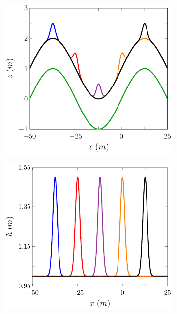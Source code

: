 \begin{figure}
	\centering
	\begin{subfigure}{0.5\textwidth}
		\includegraphics[width=\textwidth]{./chp5/figures/Forced/Wet/FDVMw.pdf}
		\vspace{0.5cm}
	\end{subfigure}%
	\begin{subfigure}{0.5\textwidth}
		\includegraphics[width=\textwidth]{./chp5/figures/Forced/Wet/FDVMh.pdf}

\end{subfigure}
\end{figure}

